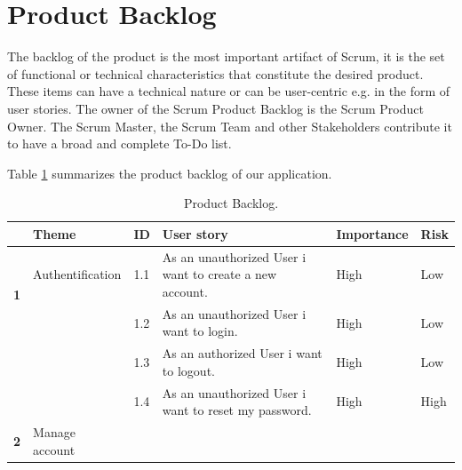 \documentclass[12pt,a4paper]{report}
\begin{document}
	\section{Product Backlog}
	The backlog of the product is the most important artifact of Scrum, it is the set of functional or technical characteristics that constitute the desired product. These items can have a technical nature or can be user-centric e.g. in the form of user stories. The owner of the Scrum Product Backlog is the Scrum Product Owner. The Scrum Master, the Scrum Team and other Stakeholders contribute it to have a broad and complete To-Do list.\par
	Table \ref{table-backlog-product} summarizes the product backlog of our application.\par 
	\begin{table}[H]
		\begin{center}
			\captionsetup[table]{skip=10pt}
			\caption{\label{table-backlog-product} Product Backlog.}
			\setlength\doublerulesep{0.5pt}
			\begin{tabular}{|  p{1cm}|  p{4cm}|  p{1cm}| p{5cm}|  p{2cm}| p{2cm}|}
				\hline 
				\rowcolor{LightCyan}
				\textbf{ } & \textbf{Theme} & \textbf{ID} & \textbf{User story} & \textbf{Importance} & \textbf{Risk} 
				\\ \hline
				\multirow{2}{*}{\textbf{1} }
				&                        
				Authentification &                        
				1.1 &                        
				As an unauthorized User i want to create a new account.&                        
				High &                        
				Low
				\\
				\cline{3-6}
				&                        
				&                        
				1.2 &                        
				As an unauthorized User i want to login.&                        
				High &                        
				Low
				\\
				\cline{3-6}
				&                        
				&                        
				1.3 &                        
				As an authorized User i want to logout.&                        
				High &                        
				Low
				\\
				\cline{3-6}
				&                        
				&                        
				1.4 &                        
				As an unauthorized User i want to reset my password.&                        
				High &                        
				High
					\\
				\hline
				\multirow{2}{*}{\textbf{2} }
				&                        
				Manage account &                        

\end{tabular}
\end{center}
\end{table}
\end{document}
